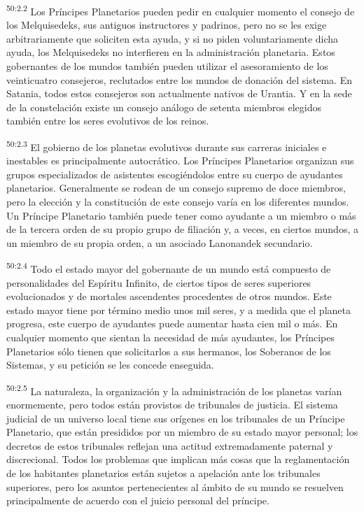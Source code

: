 \par
\textsuperscript{50:2.2} Los Príncipes Planetarios pueden pedir en cualquier momento el consejo de los Melquisedeks, sus antiguos instructores y padrinos, pero no se les exige arbitrariamente que soliciten esta ayuda, y si no piden voluntariamente dicha ayuda, los Melquisedeks no interfieren en la administración planetaria. Estos gobernantes de los mundos también pueden utilizar el asesoramiento de los veinticuatro consejeros, reclutados entre los mundos de donación del sistema. En Satania, todos estos consejeros son actualmente nativos de Urantia. Y en la sede de la constelación existe un consejo análogo de setenta miembros elegidos también entre los seres evolutivos de los reinos.

\par
\textsuperscript{50:2.3} El gobierno de los planetas evolutivos durante sus carreras iniciales e inestables es principalmente autocrático. Los Príncipes Planetarios organizan sus grupos especializados de asistentes escogiéndolos entre su cuerpo de ayudantes planetarios. Generalmente se rodean de un consejo supremo de doce miembros, pero la elección y la constitución de este consejo varía en los diferentes mundos. Un Príncipe Planetario también puede tener como ayudante a un miembro o más de la tercera orden de su propio grupo de filiación y, a veces, en ciertos mundos, a un miembro de su propia orden, a un asociado Lanonandek secundario.

\par
\textsuperscript{50:2.4} Todo el estado mayor del gobernante de un mundo está compuesto de personalidades del Espíritu Infinito, de ciertos tipos de seres superiores evolucionados y de mortales ascendentes procedentes de otros mundos. Este estado mayor tiene por término medio unos mil seres, y a medida que el planeta progresa, este cuerpo de ayudantes puede aumentar hasta cien mil o más. En cualquier momento que sientan la necesidad de más ayudantes, los Príncipes Planetarios sólo tienen que solicitarlos a sus hermanos, los Soberanos de los Sistemas, y su petición se les concede enseguida.

\par
\textsuperscript{50:2.5} La naturaleza, la organización y la administración de los planetas varían enormemente, pero todos están provistos de tribunales de justicia. El sistema judicial de un universo local tiene sus orígenes en los tribunales de un Príncipe Planetario, que están presididos por un miembro de su estado mayor personal; los decretos de estos tribunales reflejan una actitud extremadamente paternal y discrecional. Todos los problemas que implican más cosas que la reglamentación de los habitantes planetarios están sujetos a apelación ante los tribunales superiores, pero los asuntos pertenecientes al ámbito de su mundo se resuelven principalmente de acuerdo con el juicio personal del príncipe.

